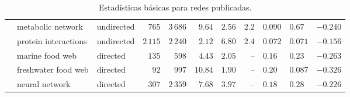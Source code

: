 \begin{table}[!hbt]
{\begin{tabular}{l|l|l|r|r|r|r|r|l|l|r|}
 & metabolic network         & undirected & $765$           & $3\,686$           & $9.64$  & $2.56$  & $2.2$
 & $0.090$ & $0.67$  & $-0.240$  \\
 & protein interactions      & undirected & $2\,115$        & $2\,240$           & $2.12$  & $6.80$  & $2.4$
 & $0.072$ & $0.071$ & $-0.156$  \\
 & marine food web           & directed   & $135$           & $598$              & $4.43$  & $2.05$  & --
 & $0.16$  & $0.23$  & $-0.263$  \\
 & freshwater food web       & directed   & $92$            & $997$              & $10.84$ & $1.90$  & --
 & $0.20$  & $0.087$ & $-0.326$  \\
 & neural network            & directed   & $307$           & $2\,359$           & $7.68$  & $3.97$  & --
 & $0.18$  & $0.28$  & $-0.226$  \\
\end{tabular}
}
\caption{Estadísticas básicas para redes publicadas.}
\label{table:networks}
\end{table}


